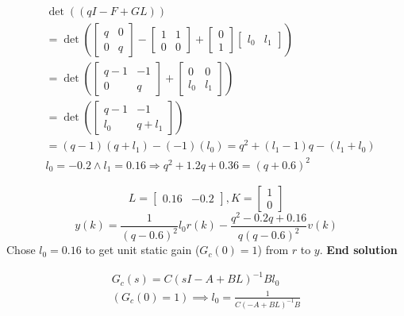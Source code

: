 \begin{multicols}{2}
\begin{align*}
    &\det((qI-F+GL)) \\
    &= \det\left( \begin{bmatrix} q & 0 \\ 0 & q \end{bmatrix} - \begin{bmatrix} 1 & 1 \\ 0 & 0 \end{bmatrix} + \begin{bmatrix} 0 \\ 1 \end{bmatrix}\begin{bmatrix} l_0 & l_1 \end{bmatrix} \right) \\
    &= \det\left( \begin{bmatrix} q-1 & -1 \\ 0 & q \end{bmatrix} + \begin{bmatrix} 0 & 0 \\ l_0 & l_1 \end{bmatrix} \right) \\
    &= \det\left( \begin{bmatrix} q-1 & -1 \\ l_0 & q+l_1 \end{bmatrix} \right) \\
    &= (q-1)(q+l_1) - (-1)(l_0) = q^2 + (l_1-1)q -(l_1 + l_0) \\
    &l_0=-0.2 \land l_1=0.16 \Rightarrow q^2 + 1.2q + 0.36 = (q+0.6)^2 
\end{align*}


\begin{equation*}
    L = \begin{bmatrix} 0.16 & -0.2 \end{bmatrix}, K = \begin{bmatrix} 1 \\ 0 \end{bmatrix}
\end{equation*}
\begin{equation*}
    y(k) = \frac{1}{(q-0.6)^2}l_0r(k) - \frac{q^2-0.2q+0.16}{q(q-0.6)^2}v(k)
\end{equation*}
Chose $l_0=0.16$ to get unit static gain ($G_c(0)=1$) from $r$ to $y$.\newline
\textbf{End solution} 

\begin{align*}
    G_c(s) = C(sI-A+BL)^{-1}Bl_0 \\
    (G_c(0)=1) \implies l_0 = \frac{1}{C(-A+BL)^{-1}B} \\
\end{align*}



\end{multicols}
